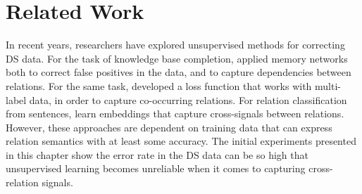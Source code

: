 




\section{Related Work}


In recent years, researchers have explored unsupervised methods for correcting DS data. For the task of knowledge base completion, \cite{DBLP:conf/ijcai/FengGQLL17} applied memory networks both to correct false positives in the data, and to capture dependencies between relations. For the same task, \cite{Jiang2016RelationEW} developed a loss function that works with multi-label data, in order to capture co-occurring relations. For relation classification from sentences, \cite{DBLP:conf/acl/SantosXZ15} learn embeddings that capture cross-signals between relations. However, these approaches are dependent on training data that can express relation semantics with at least some accuracy. The initial experiments presented in this chapter show the error rate in the DS data can be so high that unsupervised learning becomes unreliable when it comes to capturing cross-relation signals.

